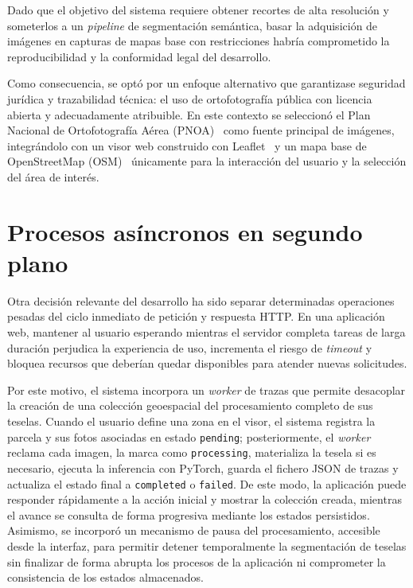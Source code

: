 Dado que el objetivo del sistema requiere obtener recortes de alta resolución y someterlos a un \textit{pipeline} de segmentación semántica, basar la adquisición de imágenes en capturas de mapas base con restricciones habría comprometido la reproducibilidad y la conformidad legal del desarrollo.

Como consecuencia, se optó por un enfoque alternativo que garantizase seguridad jurídica y trazabilidad técnica: el uso de ortofotografía pública con licencia abierta y adecuadamente atribuible. En este contexto se seleccionó el Plan Nacional de Ortofotografía Aérea (PNOA)~\cite{pnoa_ign,cnig_pnoa_maxima_actualidad} como fuente principal de imágenes, integrándolo con un visor web construido con Leaflet~\cite{leaflet_web} y un mapa base de OpenStreetMap (OSM)~\cite{osm_web} únicamente para la interacción del usuario y la selección del área de interés.

\section{Procesos asíncronos en segundo plano}

Otra decisión relevante del desarrollo ha sido separar determinadas operaciones pesadas del ciclo inmediato de petición y respuesta HTTP. En una aplicación web, mantener al usuario esperando mientras el servidor completa tareas de larga duración perjudica la experiencia de uso, incrementa el riesgo de \textit{timeout} y bloquea recursos que deberían quedar disponibles para atender nuevas solicitudes. 

Por este motivo, el sistema incorpora un \textit{worker} de trazas que permite desacoplar la creación de una colección geoespacial del procesamiento completo de sus teselas. Cuando el usuario define una zona en el visor, el sistema registra la parcela y sus fotos asociadas en estado \texttt{pending}; posteriormente, el \textit{worker} reclama cada imagen, la marca como \texttt{processing}, materializa la tesela si es necesario, ejecuta la inferencia con PyTorch, guarda el fichero JSON de trazas y actualiza el estado final a \texttt{completed} o \texttt{failed}. De este modo, la aplicación puede responder rápidamente a la acción inicial y mostrar la colección creada, mientras el avance se consulta de forma progresiva mediante los estados persistidos. Asimismo, se incorporó un mecanismo de pausa del procesamiento, accesible desde la interfaz, para permitir detener temporalmente la segmentación de teselas sin finalizar de forma abrupta los procesos de la aplicación ni comprometer la consistencia de los estados almacenados.

